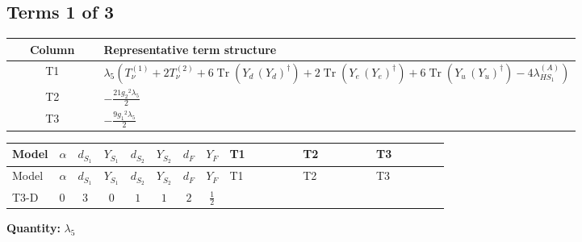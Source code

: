 \documentclass[8pt]{article}
\begin{document}
\begin{landscape}
\subsection*{Terms 1 of 3}
\begin{center}
\begin{tabular}{@{}c >{\raggedright\arraybackslash}p{0.82\linewidth}@{}}
\toprule
Column & Representative term structure \\
\midrule
T1 & \(\displaystyle {\lambda_5} (T_{\nu}^{(1)}+2 T_{\nu}^{(2)}+6 \operatorname{Tr}\!\left({Y_d}\,\left({Y_d}\right)^{\dagger}\right)+2 \operatorname{Tr}\!\left({Y_e}\,\left({Y_e}\right)^{\dagger}\right)+6 \operatorname{Tr}\!\left({Y_u}\,\left({Y_u}\right)^{\dagger}\right)-4 {\lambda_{HS_1}^{(A)}})\) \\
\midrule
T2 & \(\displaystyle -\frac{21 {g_2}^2 {\lambda_5}}{2}\) \\
\midrule
T3 & \(\displaystyle -\frac{9 {g_1}^2 {\lambda_5}}{2}\) \\
\midrule
\bottomrule
\end{tabular}
\end{center}
\smallskip
\tiny
\begin{longtable}{@{}llcccccc >{\raggedright\arraybackslash}p{0.21\linewidth} >{\raggedright\arraybackslash}p{0.21\linewidth} >{\raggedright\arraybackslash}p{0.21\linewidth}@{}}
\toprule
Model & $\alpha$ & $d_{S_1}$ & $Y_{S_1}$ & $d_{S_2}$ & $Y_{S_2}$ & $d_F$ & $Y_F$ & T1 & T2 & T3 \\
\midrule
\endfirsthead
\toprule
Model & $\alpha$ & $d_{S_1}$ & $Y_{S_1}$ & $d_{S_2}$ & $Y_{S_2}$ & $d_F$ & $Y_F$ & T1 & T2 & T3 \\
\midrule
\endhead
T3-D & $0$ & $3$ & $0$ & $1$ & $1$ & $2$ & $\frac{1}{2}$ & \scriptsize\adjustbox{max width=\linewidth}{$\begin{gathered} {\lambda_5} (T_{\nu}^{(1)}+2 T_{\nu}^{(2)}+6 \operatorname{Tr}\!\left({Y_d}\,\left({Y_d}\right)^{\dagger}\right)+2 \operatorname{Tr}\!\left({Y_e}\,\left({Y_e}\right)^{\dagger}\right)+6 \operatorname{Tr}\!\left({Y_u}\,\left({Y_u}\right)^{\dagger}\right)-4 {\lambda_{HS_1}^{(A)}})\end{gathered}$} & \scriptsize\adjustbox{max width=\linewidth}{$\begin{gathered} -\frac{21 {g_2}^2 {\lambda_5}}{2}\end{gathered}$} & \scriptsize\adjustbox{max width=\linewidth}{$\begin{gathered} -\frac{9 {g_1}^2 {\lambda_5}}{2}\end{gathered}$} \\
\midrule
\bottomrule
\end{longtable}
\clearpage
\noindent\textbf{Quantity: }$\lambda_5$\par\smallskip

\end{landscape}
\end{document}
